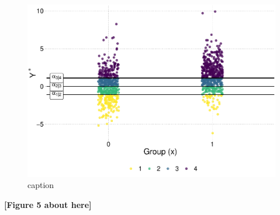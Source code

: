 \documentclass[
  man,floatsintext]{apa6}
\begin{document}
\normalsize

\scriptsize

\begin{figure}

{\centering \includegraphics{paper-new_files/figure-latex/fig-sim-from-latent-1} 

}

\caption{caption}\label{fig:fig-sim-from-latent}
\end{figure}

\begin{center}\textbf{[Figure 5 about here]} \end{center}

\normalsize

\scriptsize
\end{document}
